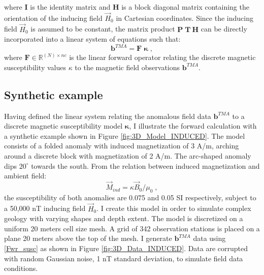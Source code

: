 where $\mathbf{I}$ is the identity matrix and $\mathbf{H}$  is a block diagonal matrix containing the orientation of the inducing field $\vec H_0$ in Cartesian coordinates.
Since the inducing field $\vec H_0$ is assumed to be constant, the matrix product  $\mathbf{P\;T\:H}$ can be directly incorporated into a linear system of equations such that:
\begin{equation} \label{Fwr_susc}
\mathbf{b}^{TMA} = \mathbf{F} \;  \boldsymbol{\kappa}  \;,
\end{equation}
where  $\mathbf{F} \in \mathbb{R}^{(N) \times nc}$ is the linear forward operator relating the discrete magnetic susceptibility values $\kappa$ to the magnetic field observations $\mathbf{b}^{TMA}$.

\subsection{Synthetic example}\label{Induced Mag}
Having defined the linear system relating the anomalous field data  $\mathbf{b}^{TMA}$ to a discrete magnetic susceptibility model $\boldsymbol{\kappa}$, I illustrate the forward calculation with a synthetic example shown in Figure \ref{fig:3D_Model_INDUCED}.
The model consists of a folded anomaly with induced magnetization of 3 A/m, arching around a discrete block with magnetization of 2 A/m. The arc-shaped anomaly dips $20^\circ$ towards the south. 
From the relation between induced magnetization and ambient field:
\begin{equation}
\vec M_{ind} = \kappa \vec B_0 / \mu_0 \;,
\end{equation}
 the susceptibility of both anomalies are 0.075 and 0.05 SI respectively, subject to a 50,000 nT inducing field $\vec H_0$.
I create this model in order to simulate complex geology with varying shapes and depth extent.
The model is discretized  on a uniform 20 meters cell size mesh.
A grid of 342 observation stations is placed on a plane 20 meters above the top of the mesh.
I generate $\mathbf{b}^{TMA}$ data using \ref{Fwr_susc} as shown in Figure \ref{fig:3D_Data_INDUCED}.
Data are corrupted with random Gaussian noise, 1 nT standard deviation, to simulate field data conditions.
